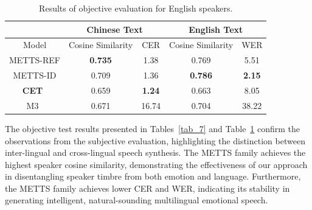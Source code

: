 \documentclass[journal,comsoc]{IEEEtran}
\begin{document}
\begin{table}[htb!]
\centering
\caption{Results of objective evaluation for English speakers.}
\label{tab_8}
\begin{tabular}{@{}c|cc|cc@{}}
\toprule
                             & \multicolumn{2}{c|}{Chinese Text} & \multicolumn{2}{c}{English Text} \\ \midrule
Model                        & Cosine Similarity                & CER          & Cosine Similarity             & WER            \\ \midrule
METTS-REF   & \textbf{0.735}            & 1.38                           & 0.769 & 5.51                                              \\
METTS-ID    & 0.709            & 1.36                           & \textbf{0.786}  & \textbf{2.15}                           \\
\textbf{CET}~\cite{DBLP:journals/corr/abs-2110-04153}     & 0.659                     & \textbf{1.24}                  & 0.663                   & 8.05                           \\
M3~\cite{DBLP:conf/interspeech/ShangHZZ021}           & 0.671                     & 16.74                          & 0.704                       & 38.22                                      \\ \bottomrule
\end{tabular}
\end{table}


The objective test results presented in Tables~\ref{tab_7} and Table~\ref{tab_8} confirm the observations from the subjective evaluation, highlighting the distinction between inter-lingual and cross-lingual speech synthesis. The METTS family achieves the highest speaker cosine similarity, demonstrating the effectiveness of our approach in disentangling speaker timbre from both emotion and language. Furthermore, the METTS family achieves lower CER and WER, indicating its stability in generating intelligent, natural-sounding multilingual emotional speech.
\end{document}
